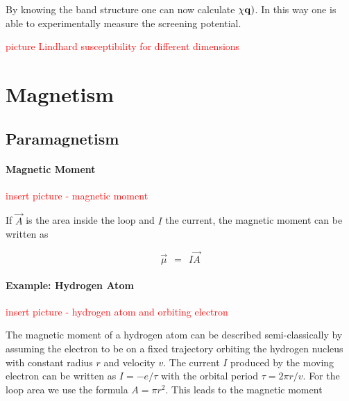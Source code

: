 \documentclass[10pt]{report}
\numberwithin{equation}{chapter}
\newcommand{\vc}[1]{ %
  \mathbf{#1}
}
\begin{document}
By knowing the band structure one can now calculate $\chi{\vc{q})}$. In this way one is able to experimentally measure the screening potential.



\textcolor{red}{picture Lindhard susceptibility for different dimensions}







\chapter{Magnetism}

\section{Paramagnetism}

\subsubsection{Magnetic Moment}

\textcolor{red}{insert picture - magnetic moment}

If $\vec{A}$ is the area inside the loop and $I$ the current, the magnetic moment can be written as

\begin{equation} \label{eq:mag_mom}
  \vec{\mu} ~~=~~ I \vec{A}
\end{equation}


\subsubsection{Example: Hydrogen Atom}

\textcolor{red}{insert picture - hydrogen atom and orbiting electron}

The magnetic moment of a hydrogen atom can be described semi-classically by assuming the electron to be on a fixed trajectory orbiting the hydrogen nucleus with constant radius $r$ and velocity $v$. The current $I$ produced by the moving electron can be written as $I = -e/\tau$ with the orbital period $\tau = 2\pi r/v$. For the loop area we use the formula $A= \pi r^2$. This leads to the magnetic moment
\end{document}
